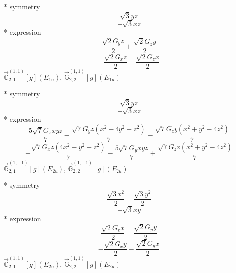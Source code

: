 \documentclass[fleqn,8pt]{jsarticle}
\begin{document}
\noindent\quad ** symmetry
\begin{dmath*}
\sqrt{3} y z
\end{dmath*}
\begin{dmath*}
- \sqrt{3} x z
\end{dmath*}
\noindent\quad ** expression
\begin{dmath*}
\frac{\sqrt{2} G_{y} z}{2} + \frac{\sqrt{2} G_{z} y}{2}
\end{dmath*}
\begin{dmath*}
- \frac{\sqrt{2} G_{x} z}{2} - \frac{\sqrt{2} G_{z} x}{2}
\end{dmath*}
\noindent\quad $\vec{\mathbb{G}}_{2,1}^{(1,1)}[g](E_{1u})$, $\vec{\mathbb{G}}_{2,2}^{(1,1)}[g](E_{1u})$

\noindent\quad ** symmetry
\begin{dmath*}
\sqrt{3} y z
\end{dmath*}
\begin{dmath*}
- \sqrt{3} x z
\end{dmath*}
\noindent\quad ** expression
\begin{dmath*}
\frac{5 \sqrt{7} G_{x} x y z}{7} - \frac{\sqrt{7} G_{y} z \left(x^{2} - 4 y^{2} + z^{2}\right)}{7} - \frac{\sqrt{7} G_{z} y \left(x^{2} + y^{2} - 4 z^{2}\right)}{7}
\end{dmath*}
\begin{dmath*}
- \frac{\sqrt{7} G_{x} z \left(4 x^{2} - y^{2} - z^{2}\right)}{7} - \frac{5 \sqrt{7} G_{y} x y z}{7} + \frac{\sqrt{7} G_{z} x \left(x^{2} + y^{2} - 4 z^{2}\right)}{7}
\end{dmath*}
\noindent\quad $\vec{\mathbb{G}}_{2,1}^{(1,-1)}[g](E_{2u})$, $\vec{\mathbb{G}}_{2,2}^{(1,-1)}[g](E_{2u})$

\noindent\quad ** symmetry
\begin{dmath*}
\frac{\sqrt{3} x^{2}}{2} - \frac{\sqrt{3} y^{2}}{2}
\end{dmath*}
\begin{dmath*}
- \sqrt{3} x y
\end{dmath*}
\noindent\quad ** expression
\begin{dmath*}
\frac{\sqrt{2} G_{x} x}{2} - \frac{\sqrt{2} G_{y} y}{2}
\end{dmath*}
\begin{dmath*}
- \frac{\sqrt{2} G_{x} y}{2} - \frac{\sqrt{2} G_{y} x}{2}
\end{dmath*}
\noindent\quad $\vec{\mathbb{G}}_{2,1}^{(1,1)}[g](E_{2u})$, $\vec{\mathbb{G}}_{2,2}^{(1,1)}[g](E_{2u})$
\end{document}
